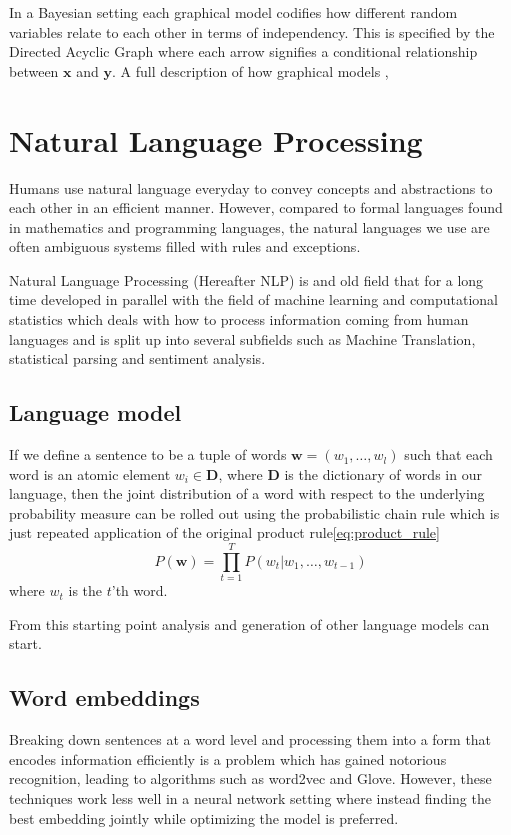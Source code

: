 In a Bayesian setting each graphical model codifies how different random variables relate
to each other in terms of independency. This is specified by the Directed
Acyclic Graph where each arrow signifies a conditional relationship between
$\bm{x}$ and $\bm{y}$. A full description of how graphical models ,

\section{Natural Language Processing}

Humans use natural language everyday to convey concepts and abstractions to each
other in an efficient manner. However, compared to formal languages found in
mathematics and programming languages, the natural languages we use are often
ambiguous systems filled with rules and exceptions\cite{Rosenfeld00twodecades, sep-computational-linguistics}.

Natural Language Processing (Hereafter NLP) is and old field that for a long
time developed in parallel with the field of machine learning and
computational statistics which deals with how to process information coming from
human languages and is split up into several subfields such as Machine
Translation, statistical parsing and sentiment analysis\cite{sep-computational-linguistics}.

\subsection{Language model}
If we define a sentence to be a tuple of words $\bm{w} = (w_1, \dots,
w_l)$ such that each word is an atomic element $w_i \in \mathbf{D}$, where $\mathbf{D}$ is the
dictionary of words in our language, then the joint distribution of a word with
respect to the underlying probability measure can be rolled out using the
probabilistic chain rule which is just repeated application of the original
product rule\ref{eq:product_rule}
\begin{equation}
  \label{eq:conditional_language_probability}
  P(\bm{w}) = \prod_{t = 1}^TP(w_t | w_1, \dots, w_{t-1})
\end{equation}
where $w_t$ is the $t$'th word.\cite{Bengio:2003:NPL:944919.944966}

From this starting point analysis and generation of other language models can start.

\subsection{Word embeddings}
Breaking down sentences at a word level and processing them into a form that
encodes information efficiently is a problem which has gained notorious
recognition, leading to algorithms such as word2vec and
Glove\cite{DBLP:journals/corr/abs-1301-3781, Pennington14glove:global,
  Mikolov:2013:DRW:2999792.2999959}. However, these techniques work less well in
a neural network setting where instead finding the best embedding jointly while
optimizing the model is preferred\cite[p.~5-7]{goldberg2015primer}.

